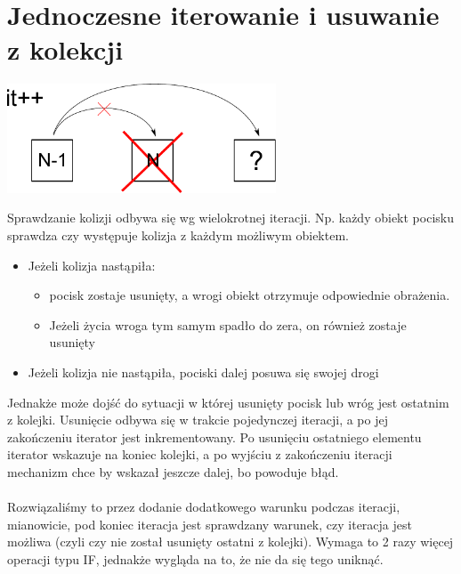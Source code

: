 \documentclass[a4paper,twoside]{article}
\begin{document}
		\section{Jednoczesne iterowanie i usuwanie z kolekcji}
			\begin{center}
				\includegraphics[width=0.6\textwidth]{./images/iteracja01}
			\end{center}
			Sprawdzanie kolizji odbywa się wg wielokrotnej iteracji. Np. każdy obiekt pocisku sprawdza czy występuje kolizja z każdym możliwym obiektem.
			\begin{itemize}
				\item Jeżeli kolizja nastąpiła:
				\begin{itemize}
					\item pocisk zostaje usunięty, a wrogi obiekt otrzymuje odpowiednie obrażenia.
					\item Jeżeli życia wroga tym samym spadło do zera, on również zostaje usunięty
				\end{itemize}
				\item Jeżeli kolizja nie nastąpiła, pociski dalej posuwa się swojej drogi
			\end{itemize}
			Jednakże może dojść do sytuacji w której usunięty pocisk lub wróg jest ostatnim z kolejki. Usunięcie odbywa się w trakcie pojedynczej iteracji, a po jej zakończeniu iterator jest inkrementowany. Po usunięciu ostatniego elementu iterator wskazuje na koniec kolejki, a po wyjściu z zakończeniu iteracji mechanizm chce by wskazał jeszcze dalej, bo powoduje błąd.\\\\
			Rozwiązaliśmy to przez dodanie dodatkowego warunku podczas iteracji, mianowicie, pod koniec iteracja jest sprawdzany warunek, czy iteracja jest możliwa (czyli czy nie został usunięty ostatni z kolejki). Wymaga to 2 razy więcej operacji typu IF, jednakże wygląda na to, że nie da się tego uniknąć.
		
\end{document}
